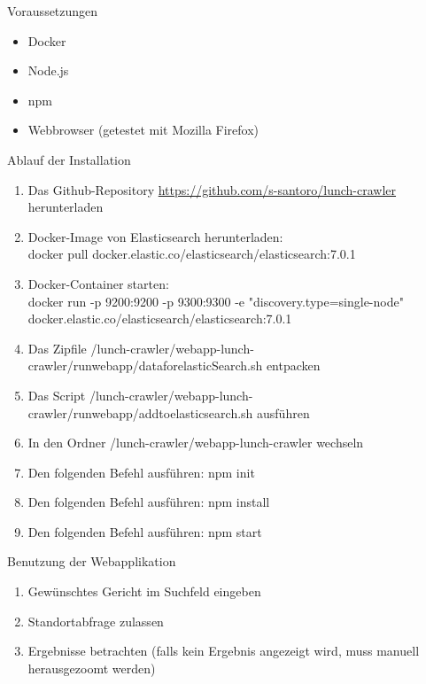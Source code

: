 Voraussetzungen
\begin{itemize}
	\item Docker
	\item Node.js
	\item npm
	\item Webbrowser (getestet mit Mozilla Firefox)
\end{itemize}
Ablauf der Installation
\begin{enumerate}
	\item Das Github-Repository \url{https://github.com/s-santoro/lunch-crawler} herunterladen
	\item Docker-Image von Elasticsearch herunterladen:\\
	docker pull docker.elastic.co/elasticsearch/elasticsearch:7.0.1
	\item Docker-Container starten:\\
	docker run -p 9200:9200 -p 9300:9300 -e "discovery.type=single-node" \\ docker.elastic.co/elasticsearch/elasticsearch:7.0.1
	\item Das Zipfile \glqq/lunch-crawler/webapp-lunch-crawler/run\textunderscore webapp/data\textunderscore for\textunderscore elasticSearch.sh\grqq{} entpacken
	\item Das Script \glqq/lunch-crawler/webapp-lunch-crawler/run\textunderscore webapp/add\textunderscore to\textunderscore elasticsearch.sh\grqq{} ausführen
	\item In den Ordner \glqq/lunch-crawler/webapp-lunch-crawler\grqq{} wechseln
	\item Den folgenden Befehl ausführen: npm init
	\item Den folgenden Befehl ausführen: npm install
	\item Den folgenden Befehl ausführen: npm start
\end{enumerate}
Benutzung der Webapplikation
\begin{enumerate}
	\item Gewünschtes Gericht im Suchfeld eingeben
	\item Standortabfrage zulassen
	\item Ergebnisse betrachten (falls kein Ergebnis angezeigt wird, muss manuell herausgezoomt werden)
\end{enumerate}
